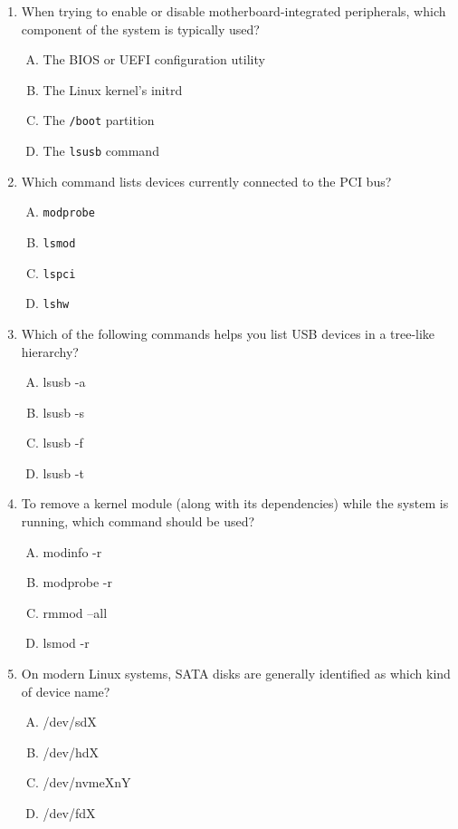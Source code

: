 \documentclass[12pt,a4paper]{report}
\begin{document}
\begin{enumerate}[1.]
\item When trying to enable or disable motherboard-integrated peripherals, which component of the system is typically used?
  \begin{enumerate}[A)]
    \item The BIOS or UEFI configuration utility
    \item The Linux kernel’s initrd
    \item The \texttt{/boot} partition
    \item The \texttt{lsusb} command

  \end{enumerate}

\item Which command lists devices currently connected to the PCI bus?
  \begin{enumerate}[A)]
    \item \texttt{modprobe}
    \item \texttt{lsmod}
    \item \texttt{lspci}
    \item \texttt{lshw}
  \end{enumerate}

\item Which of the following commands helps you list USB devices in a tree-like hierarchy?
  \begin{enumerate}[A)]
    \item lsusb -a
    \item lsusb -s
    \item lsusb -f
    \item lsusb -t
  \end{enumerate}

\item To remove a kernel module (along with its dependencies) while the system is running, which command should be used?
  \begin{enumerate}[A)]
    \item modinfo -r
    \item modprobe -r
    \item rmmod --all
    \item lsmod -r
  \end{enumerate}

\item On modern Linux systems, SATA disks are generally identified as which kind of device name?
  \begin{enumerate}[A)]
    \item /dev/sdX
    \item /dev/hdX
    \item /dev/nvmeXnY
    \item /dev/fdX
  \end{enumerate}


\end{enumerate}
\end{document}
